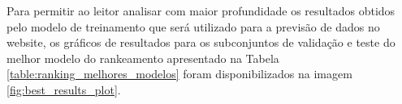Para permitir ao leitor analisar com maior profundidade os resultados obtidos pelo modelo de treinamento que será utilizado para a previsão de dados no website, os gráficos de resultados para os subconjuntos de validação e teste do melhor modelo do rankeamento apresentado na Tabela \ref{table:ranking_melhores_modelos} foram disponibilizados na imagem \ref{fig:best_results_plot}.

\begin{figure}[h]
	\centering
\end{figure}

